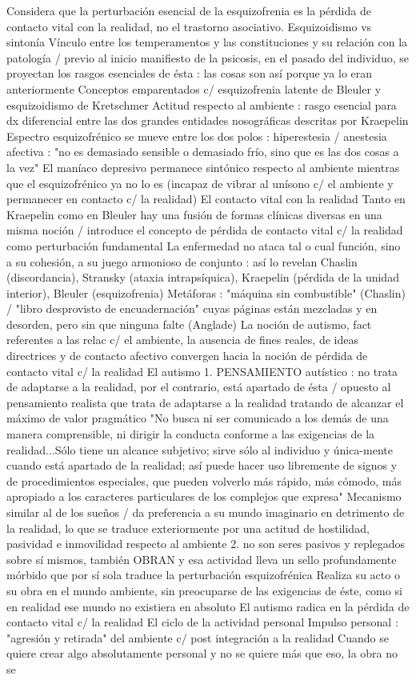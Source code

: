 \documentclass{scrbook}
\begin{document}
Considera que la perturbación esencial de la esquizofrenia es la pérdida de contacto vital con la realidad, no el trastorno asociativo. Esquizoidismo vs sintonía Vínculo entre los temperamentos y las constituciones y su relación con la patología / previo al inicio manifiesto de la psicosis, en el pasado del individuo, se proyectan los rasgos esenciales de ésta : las cosas son así porque ya lo eran anteriormente Conceptos emparentados c/ esquizofrenia latente de Bleuler y esquizoidismo de Kretschmer Actitud respecto al ambiente : rasgo esencial para dx diferencial entre las dos grandes entidades nosográficas descritas por Kraepelin Espectro esquizofrénico se mueve entre los dos polos : hiperestesia / anestesia afectiva : "no es demasiado sensible o demasiado frío, sino que es las dos cosas a la vez" El maníaco depresivo permanece sintónico respecto al ambiente mientras que el esquizofrénico ya no lo es (incapaz de vibrar al unísono c/ el ambiente y permanecer en contacto c/ la realidad) El contacto vital con la realidad Tanto en Kraepelin como en Bleuler hay una fusión de formas clínicas diversas en una misma noción / introduce el concepto de pérdida de contacto vital c/ la realidad como perturbación fundamental La enfermedad no ataca tal o cual función, sino a su cohesión, a su juego armonioso de conjunto : así lo revelan Chaslin (discordancia), Stransky (ataxia intrapsíquica), Kraepelin (pérdida de la unidad interior), Bleuler (esquizofrenia) Metáforas : "máquina sin combustible" (Chaslin) / "libro desprovisto de encuadernación" cuyas páginas están mezcladas y en desorden, pero sin que ninguna falte (Anglade) La noción de autismo, fact referentes a las relac c/ el ambiente, la ausencia de fines reales, de ideas directrices y de contacto afectivo convergen hacia la noción de pérdida de contacto vital c/ la realidad El autismo 1. PENSAMIENTO autístico : no trata de adaptarse a la realidad, por el contrario, está apartado de ésta / opuesto al pensamiento realista que trata de adaptarse a la realidad tratando de alcanzar el máximo de valor pragmático "No busca ni ser comunicado a los demás de una manera comprensible, ni dirigir la conducta conforme a las exigencias de la realidad...Sólo tiene un alcance subjetivo; sirve sólo al individuo y única-mente cuando está apartado de la realidad; así puede hacer uso libremente de signos y de procedimientos especiales, que pueden volverlo más rápido, más cómodo, más apropiado a los caracteres particulares de los complejos que expresa" Mecanismo similar al de los sueños / da preferencia a su mundo imaginario en detrimento de la realidad, lo que se traduce exteriormente por una actitud de hostilidad, pasividad e inmovilidad respecto al ambiente 2. no son seres pasivos y replegados sobre sí mismos, también OBRAN y esa actividad lleva un sello profundamente mórbido que por sí sola traduce la perturbación esquizofrénica Realiza su acto o su obra en el mundo ambiente, sin preocuparse de las exigencias de éste, como si en realidad ese mundo no existiera en absoluto El autismo radica en la pérdida de contacto vital c/ la realidad El ciclo de la actividad personal Impulso personal : "agresión y retirada" del ambiente c/ post integración a la realidad Cuando se quiere crear algo absolutamente personal y no se quiere más que eso, la obra no se 
\end{document}
